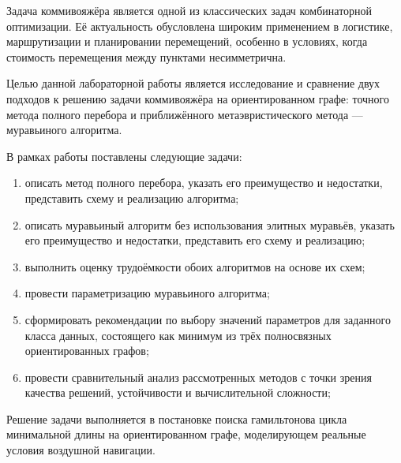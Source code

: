 
Задача коммивояжёра является одной из классических задач комбинаторной оптимизации.
Её актуальность обусловлена широким применением в логистике, маршрутизации и планировании перемещений, особенно в условиях, когда стоимость перемещения между пунктами несимметрична.

Целью данной лабораторной работы является исследование и сравнение двух подходов к решению задачи коммивояжёра на ориентированном графе: точного метода полного перебора и приближённого метаэвристического метода --- муравьиного алгоритма.

В рамках работы поставлены следующие задачи:
\begin{enumerate}
	\item описать метод полного перебора, указать его преимущество и недостатки, представить схему и реализацию алгоритма;
	\item описать муравьиный алгоритм без использования элитных муравьёв, указать его преимущество и недостатки, представить его схему и реализацию;
	\item выполнить оценку трудоёмкости обоих алгоритмов на основе их схем;
	\item провести параметризацию муравьиного алгоритма;
	\item сформировать рекомендации по выбору значений параметров для заданного класса данных, состоящего как минимум из трёх полносвязных ориентированных графов;
	\item провести сравнительный анализ рассмотренных методов с точки зрения качества решений, устойчивости и вычислительной сложности;
\end{enumerate}

Решение задачи выполняется в постановке поиска гамильтонова цикла минимальной длины на ориентированном графе, моделирующем реальные условия воздушной навигации.